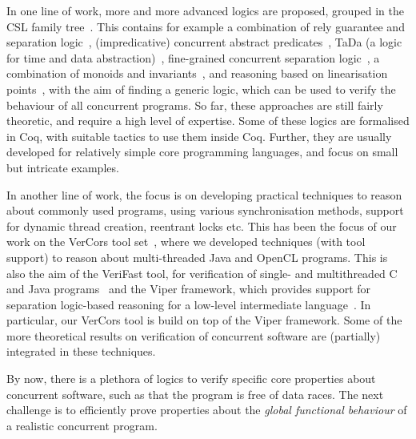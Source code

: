 In one line of work, more and more advanced logics are proposed, grouped in the CSL family tree~\cite{BrookesO16}. This contains for example a combination of rely guarantee and separation logic~\cite{VafeiadisP07}, (impredicative) concurrent abstract predicates~\cite{Dinsdale-YoungDGPV10,SvendsenB14}, TaDa (a logic for time and data abstraction)~\cite{daRochaPintoDG14,daRochaPintoDG15},  fine-grained concurrent separation logic~\cite{NanevskiLSD14,SergeyNB15}, a combination of monoids and invariants~\cite{JungSSSTBD15,KrebbersJBJDB17}, and reasoning based on linearisation points~\cite{Vafeiadis10,HemedRV15}, with the aim of finding a generic logic, which can be used to verify the behaviour of all concurrent programs. So far, these approaches are still fairly theoretic, and require a high level of expertise. Some of these logics are formalised in Coq, with suitable tactics to use them inside Coq.  Further, they 
are usually developed for relatively simple core programming languages, and focus on small but intricate examples. 

In another line of work, the focus is on developing practical techniques to reason about commonly used programs, using various synchronisation methods, support for dynamic thread creation, reentrant locks etc. This has been the focus of our work on the VerCors tool set~\cite{AmighiHHH15,AmighiBHZ12,AmighiBDHMZ14,BlomDHO17IFM}, where we developed techniques (with tool support) to reason about multi-threaded Java and OpenCL programs. This is also the aim of the VeriFast tool, for verification of single- and multithreaded C and Java programs~\cite{JacobsP08,SmansJP13} and the Viper framework, which provides support for separation logic-based reasoning for a low-level intermediate language~\cite{JKMNSS14,MuellerSS16}. In particular, our VerCors tool is build on top of the Viper framework. Some of the more theoretical results on verification of concurrent software are (partially) integrated in these techniques. 

By now, there is a plethora of logics to verify specific core properties about concurrent software, such as that the program is free of data races. The next challenge is to efficiently prove properties about the \emph{global functional behaviour} of a realistic concurrent program. 







